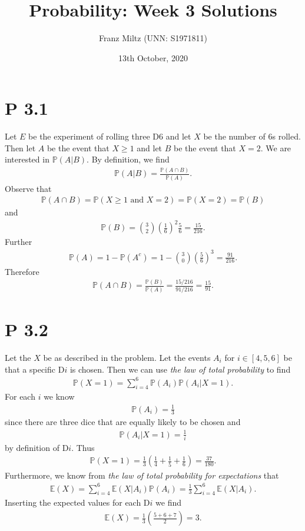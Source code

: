 \documentclass{article}
\renewcommand{\P}{\mathbb{P}}
\newcommand{\E}{\mathbb{E}}
\begin{document}
\title{Probability: Week 3 Solutions}
\author{Franz Miltz (UNN: S1971811)}
\date{13th October, 2020}
\maketitle
\section*{P 3.1}
Let $E$ be the experiment of rolling three D6 and let $X$ be the number of 6s rolled.
Then let $A$ be the event that $X\geq 1$ and let $B$ be the event that $X=2$. 
We are interested in $\P(A|B)$. By definition, we find
\begin{align*}
  \P(A|B) = \frac{\P(A\cap B)}{\P(A)}.
\end{align*}
Observe that 
\begin{align*}
  \P(A\cap B) = \P(X\geq 1 \text{ and } X = 2) = \P(X=2) = \P(B)
\end{align*}
and
\begin{align*}
  \P(B) = \binom{3}{2}\left(\frac{1}{6}\right)^2\frac{5}{6}=\frac{15}{216}.
\end{align*}
Further
\begin{align*}
  \P(A) = 1-\P(A^c) = 1-\binom{3}{0}\left(\frac{5}{6}\right)^3=\frac{91}{216}.
\end{align*}
Therefore
\begin{align*}
  \P(A\cap B) = \frac{\P(B)}{\P(A)}= \frac{15/216}{91/216} = \frac{15}{91}.
\end{align*}
\section*{P 3.2}
Let the $X$ be as described in the problem. Let the events
$A_i$ for $i\in[4,5,6]$ be that a specific D$i$ is chosen.
Then we can use \emph{the law of total probability} to find
\begin{align*}
  \P(X=1)=\sum_{i=4}^6\P(A_i)\P(A_i|X=1).
\end{align*}
For each $i$ we know
\begin{align*}
  \P(A_i) = \frac{1}{3} 
\end{align*}
since there are three dice that are equally likely to be chosen and
\begin{align*}
  \P(A_i|X=1) = \frac{1}{i}
\end{align*}
by definition of D$i$.
Thus 
\begin{align*}
  \P(X=1) = \frac{1}{3}\left(\frac{1}{4}+\frac{1}{5}+\frac{1}{6}\right)=\frac{37}{180}.
\end{align*}
Furthermore, we know from \emph{the law of total probability for expectations} that
\begin{align*}
  \E(X) = \sum_{i=4}^6 \E(X|A_i)\P(A_i) = \frac{1}{3}\sum_{i=4}^6\E(X|A_i).
\end{align*}
Inserting the expected values for each D$i$ we find
\begin{align*}
  \E(X) = \frac{1}{3}\left(\frac{5 + 6 + 7}{2}\right)=3.
\end{align*}
\end{document}
